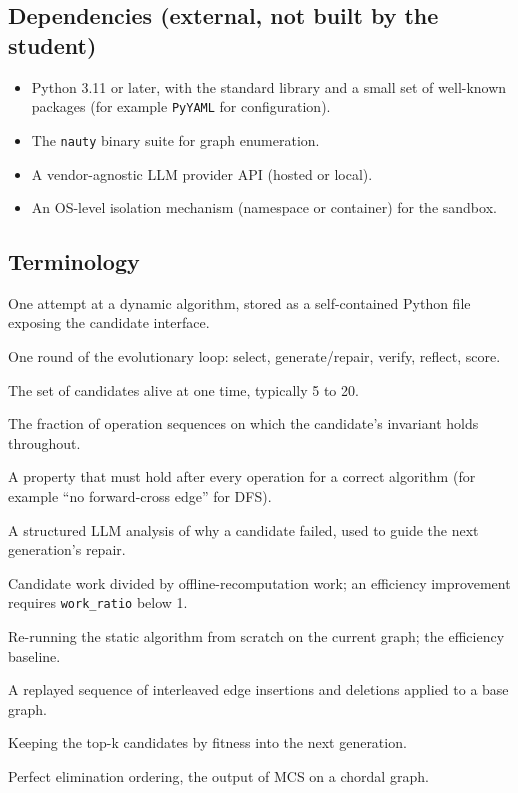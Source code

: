 \documentclass[12pt,a4paper]{article}
\begin{document}
\subsection{Dependencies (external, not built by the student)}

\begin{itemize}
  \item Python 3.11 or later, with the standard library and a small set of well-known packages (for example \texttt{PyYAML} for configuration).
  \item The \texttt{nauty} binary suite for graph enumeration.
  \item A vendor-agnostic LLM provider API (hosted or local).
  \item An OS-level isolation mechanism (namespace or container) for the sandbox.
\end{itemize}

\subsection{Terminology}

\begin{description}[style=nextline, leftmargin=2.2cm]
  \item[Candidate] One attempt at a dynamic algorithm, stored as a self-contained Python file exposing the candidate interface.
  \item[Generation] One round of the evolutionary loop: select, generate/repair, verify, reflect, score.
  \item[Population] The set of candidates alive at one time, typically 5 to 20.
  \item[Fitness] The fraction of operation sequences on which the candidate's invariant holds throughout.
  \item[Invariant] A property that must hold after every operation for a correct algorithm (for example ``no forward-cross edge'' for DFS).
  \item[Reflection] A structured LLM analysis of why a candidate failed, used to guide the next generation's repair.
  \item[work\_ratio] Candidate work divided by offline-recomputation work; an efficiency improvement requires \texttt{work\_ratio} below 1.
  \item[Offline recomputation] Re-running the static algorithm from scratch on the current graph; the efficiency baseline.
  \item[Operation sequence] A replayed sequence of interleaved edge insertions and deletions applied to a base graph.
  \item[Elitism] Keeping the top-k candidates by fitness into the next generation.
  \item[PEO] Perfect elimination ordering, the output of MCS on a chordal graph.
\end{description}
\end{document}
